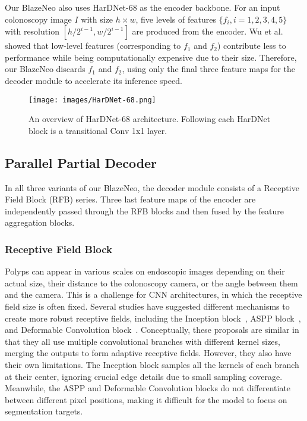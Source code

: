 \documentclass{ieeeaccess}
\newcommand{\ModelName}{BlazeNeo\xspace}
\begin{document}
Our \ModelName also uses HarDNet-68 as the encoder backbone. For an input colonoscopy image $I$ with size  ${h \times w}$, five levels of features ${\{f_{i}, i = 1, 2, 3, 4, 5\}}$ with resolution ${[h/2^{i-1}, w/2^{i-1}]}$ are produced from the encoder. Wu et al. \cite{wu2019cascaded} showed that low-level features (corresponding to $f_1$ and $f_2$) contribute less to performance while being computationally expensive due to their size. Therefore, our \ModelName discards $f_1$ and $f_2$, using only the final three feature maps for the decoder module to accelerate its inference speed.

\begin{center}
    \begin{figure}[th]
        \begin{center}
            \texttt{[image: images/HarDNet-68.png]}
        \end{center}
        \caption{An overview of HarDNet-68 architecture. Following each HarDNet block is a transitional Conv 1x1 layer.}
        \label{fig:hardnet-68}
    \end{figure}
\end{center}

\subsection{Parallel Partial Decoder}
In all three variants of our \ModelName, the decoder module consists of a Receptive Field Block (RFB) series. Three last feature maps of the encoder are independently passed through the RFB blocks and then fused by the feature aggregation blocks.


\subsubsection{Receptive Field Block}

Polyps can appear in various scales on endoscopic images depending on their actual size, their distance to the colonoscopy camera, or the angle between them and the camera. This is a challenge for CNN architectures, in which the receptive field size is often fixed. Several studies have suggested different mechanisms to create more robust receptive fields, including the Inception block~\cite{szegedy2015going}, ASPP block~\cite{chen2017deeplab}, and Deformable Convolution block~\cite{dai2017deformable}. Conceptually, these proposals are similar in that they all use multiple convolutional branches with different kernel sizes, merging the outputs to form adaptive receptive fields. However, they also have their own limitations. The Inception block samples all the kernels of each branch at their center, ignoring crucial edge details due to small sampling coverage. Meanwhile, the ASPP and Deformable Convolution blocks do not differentiate between different pixel positions, making it difficult for the model to focus on segmentation targets.
\end{document}
